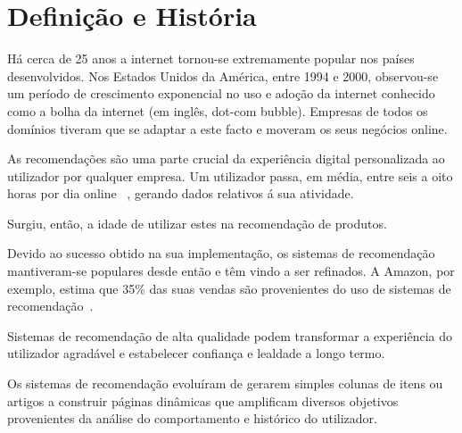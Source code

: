 \section{Definição e História}


\par Há cerca de 25 anos a internet tornou-se extremamente popular nos países desenvolvidos. Nos Estados Unidos da América, entre 1994 e 2000, observou-se um período de crescimento exponencial no uso e adoção da internet conhecido como a bolha da internet (em inglês, dot-com bubble). Empresas de todos os domínios tiveram que se adaptar a este facto e moveram os seus negócios online. 

\par As recomendações são uma parte crucial da experiência digital personalizada ao utilizador por qualquer empresa. Um utilizador passa, em média, entre seis a oito horas por dia online ~\cite{ref_history1}, gerando dados relativos á sua atividade. 

\par Surgiu, então, a idade de utilizar estes na recomendação de produtos. 

\par Devido ao sucesso obtido na sua implementação, os sistemas de recomendação mantiveram-se populares desde então e têm vindo a ser refinados. A Amazon, por exemplo, estima que 35\% das suas vendas são provenientes do uso de sistemas de recomendação~\cite{ref_history2}. 

\par Sistemas de recomendação de alta qualidade podem transformar a experiência do utilizador agradável e estabelecer confiança e lealdade a longo termo. 

\par Os sistemas de recomendação evoluíram de gerarem simples colunas de itens ou artigos a construir páginas dinâmicas que amplificam diversos objetivos provenientes da análise do comportamento e histórico do utilizador. 
